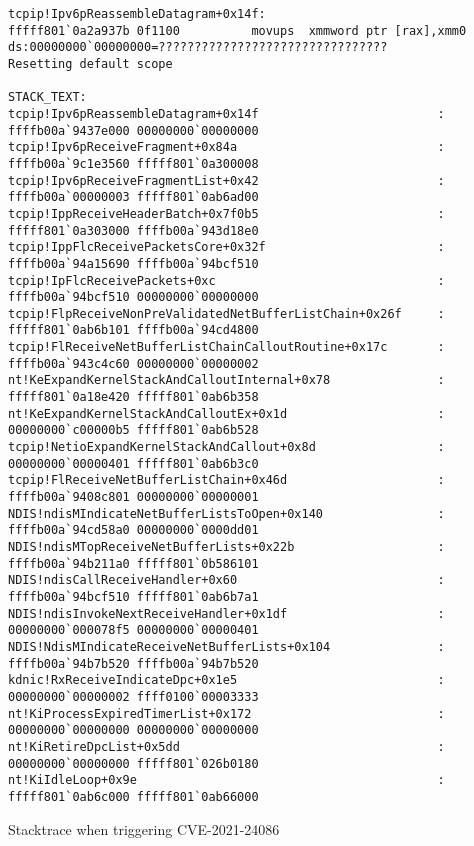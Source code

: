 \documentclass{report}
\begin{document}
\begin{listing}[H]
\begin{verbatim}
tcpip!Ipv6pReassembleDatagram+0x14f:
fffff801`0a2a937b 0f1100          movups  xmmword ptr [rax],xmm0 ds:00000000`00000000=????????????????????????????????
Resetting default scope

STACK_TEXT:  
tcpip!Ipv6pReassembleDatagram+0x14f                         : ffffb00a`9437e000 00000000`00000000
tcpip!Ipv6pReceiveFragment+0x84a                            : ffffb00a`9c1e3560 fffff801`0a300008
tcpip!Ipv6pReceiveFragmentList+0x42                         : ffffb00a`00000003 fffff801`0ab6ad00
tcpip!IppReceiveHeaderBatch+0x7f0b5                         : fffff801`0a303000 ffffb00a`943d18e0
tcpip!IppFlcReceivePacketsCore+0x32f                        : ffffb00a`94a15690 ffffb00a`94bcf510
tcpip!IpFlcReceivePackets+0xc                               : ffffb00a`94bcf510 00000000`00000000
tcpip!FlpReceiveNonPreValidatedNetBufferListChain+0x26f     : fffff801`0ab6b101 ffffb00a`94cd4800
tcpip!FlReceiveNetBufferListChainCalloutRoutine+0x17c       : ffffb00a`943c4c60 00000000`00000002
nt!KeExpandKernelStackAndCalloutInternal+0x78               : fffff801`0a18e420 fffff801`0ab6b358
nt!KeExpandKernelStackAndCalloutEx+0x1d                     : 00000000`c00000b5 fffff801`0ab6b528
tcpip!NetioExpandKernelStackAndCallout+0x8d                 : 00000000`00000401 fffff801`0ab6b3c0
tcpip!FlReceiveNetBufferListChain+0x46d                     : ffffb00a`9408c801 00000000`00000001
NDIS!ndisMIndicateNetBufferListsToOpen+0x140                : ffffb00a`94cd58a0 00000000`0000dd01
NDIS!ndisMTopReceiveNetBufferLists+0x22b                    : ffffb00a`94b211a0 fffff801`0b586101
NDIS!ndisCallReceiveHandler+0x60                            : ffffb00a`94bcf510 fffff801`0ab6b7a1
NDIS!ndisInvokeNextReceiveHandler+0x1df                     : 00000000`000078f5 00000000`00000401
NDIS!NdisMIndicateReceiveNetBufferLists+0x104               : ffffb00a`94b7b520 ffffb00a`94b7b520
kdnic!RxReceiveIndicateDpc+0x1e5                            : 00000000`00000002 ffff0100`00003333
nt!KiProcessExpiredTimerList+0x172                          : 00000000`00000000 00000000`00000000
nt!KiRetireDpcList+0x5dd                                    : 00000000`00000000 fffff801`026b0180
nt!KiIdleLoop+0x9e                                          : fffff801`0ab6c000 fffff801`0ab66000
\end{verbatim}
\caption{Stacktrace when triggering CVE-2021-24086}
\label{listing:poc:windbg}
\end{listing}
\end{document}
